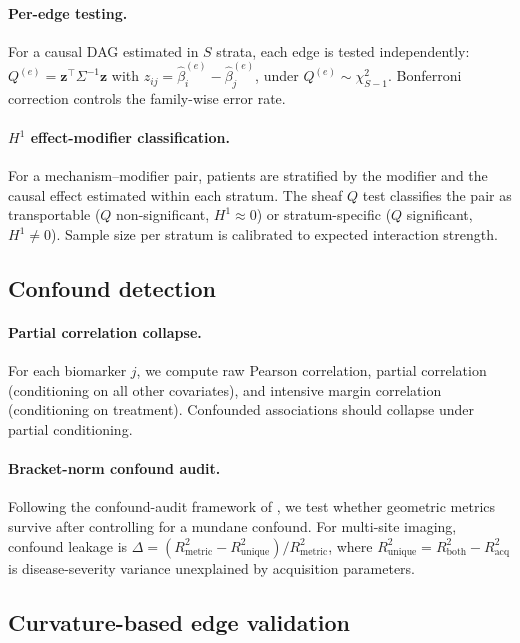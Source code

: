 \documentclass[11pt]{article}
\begin{document}
\paragraph{Per-edge testing.}
For a causal DAG estimated in $S$ strata, each edge is tested independently:
$Q^{(e)} = \mathbf{z}^\top \Sigma^{-1} \mathbf{z}$ with $z_{ij} = \hat\beta_i^{(e)} - \hat\beta_j^{(e)}$, under $Q^{(e)} \sim \chi^2_{S-1}$.
Bonferroni correction controls the family-wise error rate.

\paragraph{$H^1$ effect-modifier classification.}
For a mechanism--modifier pair, patients are stratified by the modifier and the causal effect estimated within each stratum.
The sheaf $Q$ test classifies the pair as transportable ($Q$ non-significant, $H^1 \approx 0$) or stratum-specific ($Q$ significant, $H^1 \neq 0$).
Sample size per stratum is calibrated to expected interaction strength.

\subsection{Confound detection}
\label{sec:meth-confound}

\paragraph{Partial correlation collapse.}
For each biomarker $j$, we compute raw Pearson correlation, partial correlation (conditioning on all other covariates), and intensive margin correlation (conditioning on treatment).
Confounded associations should collapse under partial conditioning.

\paragraph{Bracket-norm confound audit.}
Following the confound-audit framework of \citet{tower2026bracket}, we test whether geometric metrics survive after controlling for a mundane confound. For multi-site imaging, confound leakage is $\Delta = (R^2_{\mathrm{metric}} - R^2_{\mathrm{unique}}) / R^2_{\mathrm{metric}}$, where $R^2_{\mathrm{unique}} = R^2_{\mathrm{both}} - R^2_{\mathrm{acq}}$ is disease-severity variance unexplained by acquisition parameters.

\subsection{Curvature-based edge validation}
\label{sec:meth-curvature}
\end{document}
